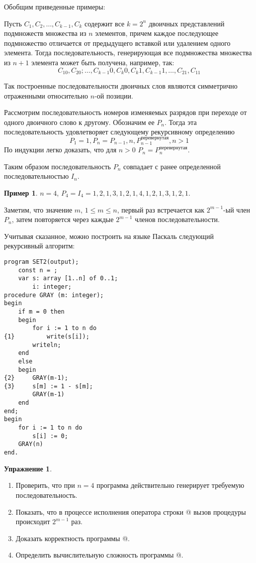 \documentclass[12pt,a4paper]{article}
\theoremstyle{plain}
\theoremstyle{definition}
\newtheorem*{task}{Упражнение}
\newtheorem*{example}{Пример}
\theoremstyle{remark}
\begin{document}
Обобщим приведенные примеры:

Пусть $C_1, C_2, \ldots, C_{k-1}, C_k$ содержит все $k=2^n$ двоичных представлений подмножеств множества из $n$ элементов, причем каждое последующее подмножество отличается от предыдущего вставкой или удалением одного элемента. Тогда последовательность, генерирующая все подмножества множества из $n+1$ элемента может быть получена, например, так:
\[ C_10, C_20; \ldots, C_{k-1}0, C_k0, C_k1, C_{k-1}1, \ldots, C_21, C_11 \]

Так построенные последовательности двоичных слов являются симметрично отраженными относительно $n$-ой позиции.

Рассмотрим последовательность номеров изменяемых разрядов при переходе от одного двоичного слово к другому. Обозначим ее $P_n$. Тогда эта последовательность удовлетворяет следующему рекурсивному определению 
\[ P_1 = 1, P_n = P_{n-1}, n, P_{n-1}^{\mbox{перевернутая}}, n > 1 \]
По индукции легко доказать, что для $n>0$ $P_n = P_n^{\mbox{перевернутая}}$. 

Таким образом последовательность $P_n$ совпадает с ранее определенной последовательностью $I_n$.

\begin{example}
$n = 4$, $P_4 = I_4 = 1, 2, 1, 3, 1, 2, 1, 4, 1, 2, 1, 3, 1, 2, 1$.
\end{example}

Заметим, что значение $m$, $1\le m\le n$, первый раз встречается как $2^{m-1}$-ый член $P_n$, затем повторяется через каждые $2^{m-1}$ членов последовательности.

Учитывая сказанное, можно построить на языке Паскаль следующий рекурсивный алгоритм:

\begin{verbatim}
program SET2(output);
    const n = ;
    var s: array [1..n] of 0..1;
        i: integer;
procedure GRAY (m: integer);
begin
    if m = 0 then
    begin
        for i := 1 to n do
{1}         write(s[i]);
        writeln;
    end
    else
    begin
{2}     GRAY(m-1);
{3}     s[m] := 1 - s[m];
        GRAY(m-1)
    end
end;
begin
    for i := 1 to n do
        s[i] := 0;
    GRAY(n)
end.
\end{verbatim}

\begin{task}
~\\
\begin{enumerate}
\item Проверить, что при $n=4$ программа действительно генерирует требуемую последовательность.
\item Показать, что в процессе исполнения оператора строки @ вызов процедуры \verb@GRAY@ происходит $2^{m-1}$ раз.
\item Доказать корректность программы @.
\item Определить вычислительную сложность программы @.
\end{enumerate}
\end{task}
\end{document}
